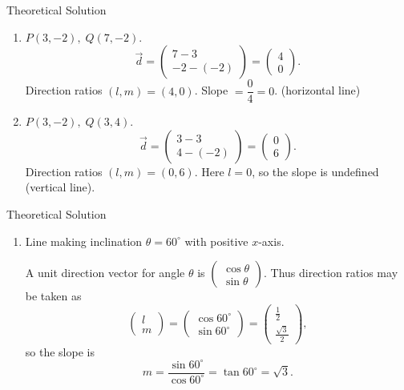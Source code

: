 \documentclass{beamer}
\begin{document}
\begin{frame}{Theoretical Solution}
\begin{enumerate}
    

\item \(P(3,-2),\;Q(7,-2)\).
\[
\vec{d}=\begin{pmatrix}7-3\\[4pt]-2-(-2)\end{pmatrix}=\begin{pmatrix}4\\[4pt]0\end{pmatrix}.
\]
Direction ratios \((l,m)=(4,0)\). Slope \(=\dfrac{0}{4}=0\). (horizontal line)

\item \(P(3,-2),\;Q(3,4)\).
\[
\vec{d}=\begin{pmatrix}3-3\\[4pt]4-(-2)\end{pmatrix}=\begin{pmatrix}0\\[4pt]6\end{pmatrix}.
\]
Direction ratios \((l,m)=(0,6)\). Here \(l=0\), so the slope is undefined (vertical line).
\end{enumerate}
\end{frame}

\begin{frame}{Theoretical Solution}
\begin{enumerate}
    

\item Line making inclination \(\theta=60^\circ\) with positive \(x\)-axis.

A unit direction vector for angle \(\theta\) is 
\(\begin{pmatrix}\cos\theta\\[4pt]\sin\theta\end{pmatrix}\).  
Thus direction ratios may be taken as
\[
\begin{pmatrix}l\\[4pt]m\end{pmatrix}=\begin{pmatrix}\cos60^\circ\\[4pt]\sin60^\circ\end{pmatrix}=\begin{pmatrix}\tfrac{1}{2}\\[4pt]\tfrac{\sqrt3}{2}\end{pmatrix},
\]
so the slope is
\[
m=\frac{\sin60^\circ}{\cos60^\circ}=\tan60^\circ=\sqrt{3}.
\]
\end{enumerate}


\end{frame}
\end{document}
